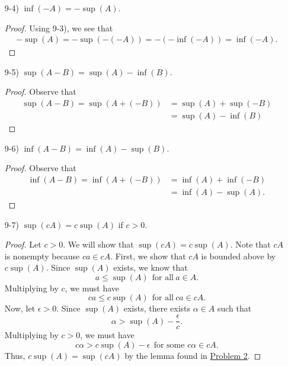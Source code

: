 \documentclass[11pt,a4paper]{article}
\begin{document}
\begin{enumerate}
\begin{enumerate}
\begin{proof}
            Let \( \epsilon > 0 \). Since \( \inf(A)  \) exists, there exists \( \gamma \in A  \) such that   
            \[  \gamma < \inf(A) + \epsilon. \]
            By multiplying by a negative on this inequality, we must have that 
            \[  - \gamma > - \inf(A) - \epsilon \]
            for some \( - \gamma \in -A  \). Thus, we must have that \( \sup(-A) = -\inf(A)  \).
            \end{proof}
        \item[9-4)] \( \inf(-A) = - \sup(A) \).
            \begin{proof}
            Using 9-3), we see that 
            \begin{align*}
                - \sup (A) = - \sup(-(-A)) = - (- \inf(-A)) = \inf(-A). 
            \end{align*}
            \end{proof}
        \item[9-5)] \( \sup (A -B) = \sup(A) - \inf(B) \).
            \begin{proof}
            Observe that 
            \begin{align*}
                \sup(A - B) = \sup(A + (-B)) &= \sup(A) + \sup(-B) \tag{9-2)} \\
                                             &= \sup(A) - \inf(B) \tag{9-3)}
            \end{align*}
            \end{proof}
        \item[9-6)] \( \inf(A - B) = \inf(A) - \sup(B) \).
            \begin{proof}
            Observe that
            \begin{align*}
                \inf(A -B) = \inf(A + (-B)) &= \inf(A) + \inf(-B) \tag{9-1)} \\
                                            &= \inf(A) - \sup(A). \tag{9-4)}
            \end{align*}
            \end{proof}
        \item[9-7)] \( \sup(cA) = c \sup (A)  \) if \( c > 0  \).
               \begin{proof}
                   Let \( c > 0  \). We will show that \( \sup(cA) = c \sup(A) \). Note that \( cA  \) is nonempty because \( ca \in cA  \). First, we show that \( cA  \) is bounded above by \( c \sup(A) \). Since \( \sup(A) \) exists, we know that  
                   \[  a \leq \sup(A) \ \ \text{for all} \ a \in A.   \]
                   Multiplying by \( c  \), we must have
                   \[  ca \leq c \sup(A) \ \ \text{for all} \  ca \in cA. \]
                   Now, let \( \epsilon > 0 \). Since \( \sup(A)  \) exists, there exists \( \alpha \in A  \) such that   
                   \[  \alpha > \sup(A) - \frac{ \epsilon }{ c }.  \]
                   Multiplying by \( c > 0  \), we must have
                   \[  c \alpha > c \sup(A) - \epsilon \ \ \text{for some } c \alpha \in cA.   \]
                   Thus, \( c \sup(A) = \sup(cA) \) by the lemma found in {\hyperref[Problem 2]{Problem 2}}. 


\end{proof}
\end{enumerate}
\end{enumerate}
\end{document}
